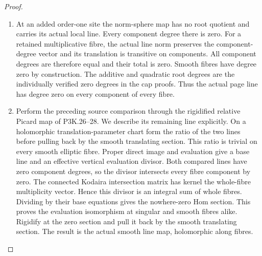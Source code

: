 \begin{proof}
\begin{enumerate}[label=\arabic*.]
\par\medskip\noindent\textbf{The corrected page line and its evaluation map.}
On each surviving root the norm-sphere map sends a
vector in the actual line
$N_i=\mathcal O(aG_i'-O_i)$ to its specified graph
level. This delta-equivariant map identifies its
associated complex line. We use all the actual
Cartier maps of the cap constructions. In particular
the quadratic root uses
\[
 \beta^*N_*
  =\pi^*\mathcal O(aG-O-L_0)+E_0+E_1,                 \tag{K32.22}
\]
including the four-point blowup correspondence
transported by P3F.49. The good-starred toric
corrections, good III/IV exceptional differences,
cancelling good-II coefficients, and reduced-root
whole-fibre factors are likewise retained.

\item At an added order-one site the norm-sphere map has
no root quotient and carries its actual local line.
Every component degree there is zero. For a retained
multiplicative fibre, the actual line norm preserves
the component-degree vector and its translation is
transitive on components. All component degrees are
therefore equal and their total is zero. Smooth
fibres have degree zero by construction. The
additive and quadratic root degrees are the
individually verified zero degrees in the cap proofs.
Thus the actual page line has degree zero on every
component of every fibre.

\item Perform the preceding source comparison through
the rigidified relative Picard map of P3K.26--28.
We describe its remaining line explicitly. On a
holomorphic translation-parameter chart form the
ratio of the two lines before pulling back by the
smooth translating section. This ratio is trivial
on every smooth elliptic fibre. Proper direct image
and evaluation give a base line and an effective
vertical evaluation divisor. Both compared lines
have zero component degrees, so the divisor
intersects every fibre component by zero. The
connected Kodaira intersection matrix has kernel
the whole-fibre multiplicity vector. Hence this
divisor is an integral sum of whole fibres.
Dividing by their base equations gives the
nowhere-zero Hom section. This proves the
evaluation isomorphism at singular and smooth
fibres alike. Rigidify at the zero section and
pull it back by the smooth translating section.
The result is the actual smooth line map,
holomorphic along fibres.


\end{enumerate}
\end{proof}
